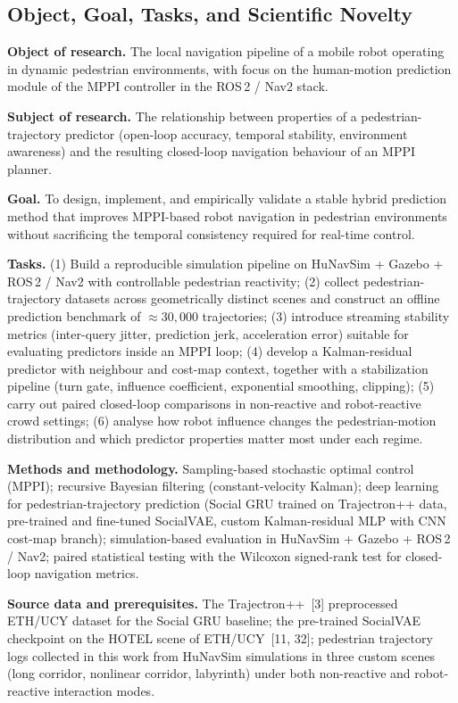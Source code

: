 \documentclass[12pt, a4paper]{article}
\begin{document}
\subsection{Object, Goal, Tasks, and Scientific Novelty}
\label{sec:objgoaltask}

\textbf{Object of research.} The local navigation pipeline of a mobile robot operating in dynamic pedestrian environments, with focus on the human-motion prediction module of the MPPI controller in the ROS\,2 / Nav2 stack.

\textbf{Subject of research.} The relationship between properties of a pedestrian-trajectory predictor (open-loop accuracy, temporal stability, environment awareness) and the resulting closed-loop navigation behaviour of an MPPI planner.

\textbf{Goal.} To design, implement, and empirically validate a stable hybrid prediction method that improves MPPI-based robot navigation in pedestrian environments without sacrificing the temporal consistency required for real-time control.

\textbf{Tasks.} (1) Build a reproducible simulation pipeline on HuNavSim + Gazebo + ROS\,2 / Nav2 with controllable pedestrian reactivity; (2) collect pedestrian-trajectory datasets across geometrically distinct scenes and construct an offline prediction benchmark of $\approx 30{,}000$ trajectories; (3) introduce streaming stability metrics (inter-query jitter, prediction jerk, acceleration error) suitable for evaluating predictors inside an MPPI loop; (4) develop a Kalman-residual predictor with neighbour and cost-map context, together with a stabilization pipeline (turn gate, influence coefficient, exponential smoothing, clipping); (5) carry out paired closed-loop comparisons in non-reactive and robot-reactive crowd settings; (6) analyse how robot influence changes the pedestrian-motion distribution and which predictor properties matter most under each regime.

\textbf{Methods and methodology.} Sampling-based stochastic optimal control (MPPI); recursive Bayesian filtering (constant-velocity Kalman); deep learning for pedestrian-trajectory prediction (Social GRU trained on Trajectron++ data, pre-trained and fine-tuned SocialVAE, custom Kalman-residual MLP with CNN cost-map branch); simulation-based evaluation in HuNavSim + Gazebo + ROS\,2 / Nav2; paired statistical testing with the Wilcoxon signed-rank test for closed-loop navigation metrics.

\textbf{Source data and prerequisites.} The Trajectron++~[3] preprocessed ETH/UCY dataset for the Social GRU baseline; the pre-trained SocialVAE checkpoint on the HOTEL scene of ETH/UCY~[11, 32]; pedestrian trajectory logs collected in this work from HuNavSim simulations in three custom scenes (long corridor, nonlinear corridor, labyrinth) under both non-reactive and robot-reactive interaction modes.
\end{document}

